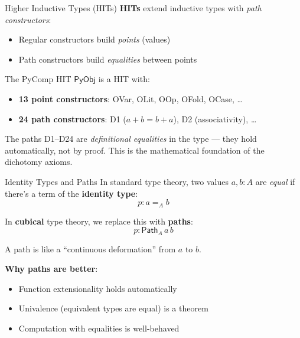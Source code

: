 \documentclass[aspectratio=169,11pt]{beamer}
\newcommand{\Path}{\mathsf{Path}}
\newcommand{\PyObj}{\mathsf{PyObj}}
\begin{document}
\begin{frame}{Higher Inductive Types (HITs)}
\textbf{HITs} extend inductive types with \emph{path constructors}:

\begin{itemize}
\item Regular constructors build \emph{points} (values)
\item Path constructors build \emph{equalities} between points
\end{itemize}

\vspace{0.5em}
\begin{block}{The PyComp HIT}
$\PyObj$ is a HIT with:
\begin{itemize}
\item \textbf{13 point constructors}: OVar, OLit, OOp, OFold, OCase, \ldots
\item \textbf{24 path constructors}: D1 ($a+b = b+a$), D2 (associativity), \ldots
\end{itemize}
\end{block}

The paths D1--D24 are \emph{definitional equalities} in the type ---
they hold automatically, not by proof.  This is the mathematical
foundation of the dichotomy axioms.
\end{frame}

\begin{frame}{Identity Types and Paths}
In standard type theory, two values $a, b : A$ are \emph{equal}
if there's a term of the \textbf{identity type}:
\[
  p : a =_A b
\]

In \textbf{cubical} type theory, we replace this with \textbf{paths}:
\[
  p : \Path_A\, a\, b
\]

A path is like a ``continuous deformation'' from $a$ to $b$.

\vspace{0.5em}
\textbf{Why paths are better}:
\begin{itemize}
\item Function extensionality holds automatically
\item Univalence (equivalent types are equal) is a theorem
\item Computation with equalities is well-behaved
\end{itemize}
\end{frame}
\end{document}
